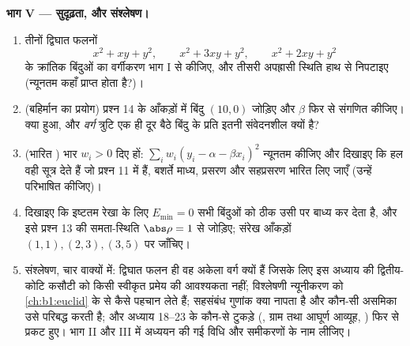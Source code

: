 \begin{problem}
\medskip
\noindent\textbf{भाग V --- सुदृढ़ता, और संश्लेषण।}
\begin{enumerate}[resume]
  \item तीनों द्विघात फलनों
        \[
        x^2 + xy + y^2, \qquad x^2 + 3xy + y^2, \qquad
        x^2 + 2xy + y^2
        \]
        के क्रांतिक बिंदुओं का वर्गीकरण भाग I से कीजिए, और तीसरी
        अपह्रासी स्थिति हाथ से निपटाइए (न्यूनतम कहाँ प्राप्त होता है?)।
  \item (बहिर्मान का प्रयोग) प्रश्न 14 के आँकड़ों में बिंदु $(10, 0)$
        जोड़िए और  $\beta$ फिर से संगणित कीजिए। क्या हुआ, और
        \emph{वर्ग} त्रुटि एक ही दूर बैठे बिंदु के प्रति इतनी
        संवेदनशील क्यों है?
  \item (भारित ) भार $w_i > 0$ दिए हों: $\sum_i w_i(y_i -
        \alpha - \beta x_i)^2$ न्यूनतम कीजिए और दिखाइए कि हल वही सूत्र
        देते हैं जो प्रश्न 11 में हैं, बशर्ते माध्य, प्रसरण और सहप्रसरण
        भारित लिए जाएँ (उन्हें परिभाषित कीजिए)।
  \item दिखाइए कि इष्टतम रेखा के लिए $E_{\min} = 0$ सभी बिंदुओं को ठीक
        उसी पर बाध्य कर देता है, और इसे प्रश्न 13 की समता-स्थिति
        $\abs\rho = 1$ से जोड़िए; संरेख आँकड़ों $(1,1), (2,3), (3,5)$ पर
        जाँचिए।
  \item संश्लेषण, चार वाक्यों में: द्विघात फलन ही वह अकेला वर्ग क्यों
        हैं जिसके लिए इस अध्याय की द्वितीय-कोटि कसौटी को किसी स्वीकृत
        प्रमेय की आवश्यकता नहीं;  विश्लेषणी न्यूनीकरण
        को \cref{ch:b1:euclid} के  से कैसे पहचान लेते
        हैं; सहसंबंध गुणांक क्या नापता है और कौन-सी असमिका उसे परिबद्ध
        करती है; और अध्याय 18--23 के कौन-से टुकड़े (, ग्राम तथा
        आघूर्ण आव्यूह, ) फिर से प्रकट हुए। भाग II और III में
        अध्ययन की गई विधि और समीकरणों के नाम लीजिए।
\end{enumerate}
\end{problem}
